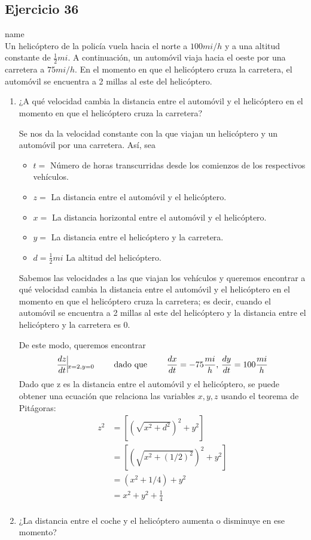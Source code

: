 \documentclass[12pt]{article}
\begin{document}
\subsection{Ejercicio 36} name \\

Un helicóptero de la policía vuela hacia el norte a $100 mi/h$ y a una altitud constante de $\frac{1}{2} mi$. A continuación, un automóvil viaja hacia el oeste por una carretera a $75 mi/h$. En el momento en que el helicóptero cruza la carretera, el automóvil se encuentra a 2 millas al este del helicóptero.
\begin{enumerate}
\item ¿A qué velocidad cambia la distancia entre el automóvil y el helicóptero en el momento en que el helicóptero cruza la carretera?

Se nos da la velocidad constante con la que viajan un helicóptero y un automóvil por una carretera. Así, sea
\begin{itemize}
\item $t=$ Número de horas transcurridas desde los comienzos de los respectivos vehículos.
\item $z=$ La distancia entre el automóvil y el helicóptero.
\item $x=$ La distancia horizontal entre el automóvil y el helicóptero.
\item $y=$ La distancia entre el helicóptero y la carretera.
\item $d=\frac{1}{2} mi$ La altitud del helicóptero.
\end{itemize}
Sabemos las velocidades a las que viajan los vehículos y queremos encontrar a qué velocidad cambia la distancia entre el automóvil y el helicóptero en el momento en que el helicóptero cruza la carretera; es decir, cuando el automóvil se encuentra a 2 millas al este del helicóptero y la distancia entre el helicóptero y la carretera es 0. 

De este modo, queremos encontrar
\begin{align*}
  \frac{dz}{dt}\vline_{x=2, y=0} \qquad \text{ dado que } \qquad \frac{dx}{dt}=-75\frac{mi}{h} \text{, } \frac{dy}{dt}=100\frac{mi}{h}
\end{align*}
Dado que z es la distancia entre el automóvil y el helicóptero, se puede obtener una ecuación que relaciona las variables $x,y,z$ usando el teorema de Pitágoras:
\begin{equation*}
  \begin{split}
    z^2
    &=[(\sqrt{x^2+d^2})^2+y^2] \\
    &=[(\sqrt{x^2+(1/2)^2})^2+y^2] \\
    &=(x^2+1/4)+y^2 \\
    &=x^2+y^2+\frac{1}{4} \\
  \end{split}
\end{equation*}

\item ¿La distancia entre el coche y el helicóptero aumenta o disminuye en ese momento?
\end{enumerate}
\end{document}
